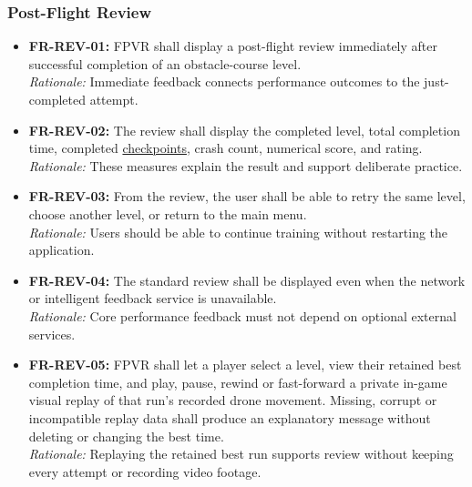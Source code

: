 \documentclass[12pt]{article}
\begin{document}
\subsubsection{Post-Flight Review}
\label{sec:s2-review}
\begin{itemize}
\item \hypertarget{req:FR-REV-01}{}\textbf{FR-REV-01:} FPVR shall display a post-flight review immediately after successful completion of an obstacle-course level.\\
\textit{Rationale:} Immediate feedback connects performance outcomes to the just-completed attempt.
\item \hypertarget{req:FR-REV-02}{}\textbf{FR-REV-02:} The review shall display the completed level, total completion time, completed \hyperlink{glos:Checkpoint}{checkpoints}, crash count, numerical score, and rating.\\
\textit{Rationale:} These measures explain the result and support deliberate practice.
\item \hypertarget{req:FR-REV-03}{}\textbf{FR-REV-03:} From the review, the user shall be able to retry the same level, choose another level, or return to the main menu.\\
\textit{Rationale:} Users should be able to continue training without restarting the application.
\item \hypertarget{req:FR-REV-04}{}\textbf{FR-REV-04:} The standard review shall be displayed even when the network or intelligent feedback service is unavailable.\\
\textit{Rationale:} Core performance feedback must not depend on optional external services.
\item \hypertarget{req:FR-REV-05}{}\textbf{FR-REV-05:} FPVR shall let a player select a level, view their retained best completion time, and play, pause, rewind or fast-forward a private in-game visual replay of that run's recorded drone movement. Missing, corrupt or incompatible replay data shall produce an explanatory message without deleting or changing the best time.\\
\textit{Rationale:} Replaying the retained best run supports review without keeping every attempt or recording video footage.
\end{itemize}
\end{document}
